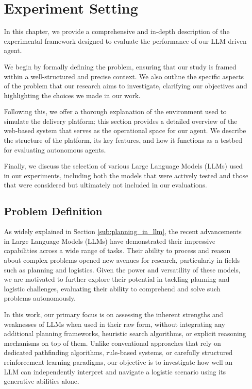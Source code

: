 \chapter{Experiment Setting}
\label{cha:experiment_setting}

In this chapter, we provide a comprehensive and in-depth description of the experimental
framework designed to evaluate the performance of our LLM-driven agent.

We begin by formally defining the problem, ensuring that our study is framed
within a well-structured and precise context. We also outline the specific aspects
of the problem that our research aims to investigate, clarifying our objectives
and highlighting the choices we made in our work.

Following this, we offer a thorough explanation of the environment used to simulate
the delivery platform; this section provides a detailed overview of the web-based
system that serves as the operational space for our agent. We describe the structure
of the platform, its key features, and how it functions as a testbed for evaluating
autonomous agents.

Finally, we discuss the selection of various Large Language Models (LLMs) used
in our experiments, including both the models that were actively tested and those
that were considered but ultimately not included in our evaluations.

\section{Problem Definition}
\label{sec:problem_definition}

As widely explained in Section \ref{sub:planning_in_llm}, the recent advancements
in Large Language Models (LLMs) have demonstrated their impressive capabilities across
a wide range of tasks. Their ability to process and reason about complex
problems opened new avenues for research, particularly in fields such as planning
and logistics. Given the power and versatility of these models, we are motivated
to further explore their potential in tackling planning and logistic challenges,
evaluating their ability to comprehend and solve such problems autonomously.

In this work, our primary focus is on assessing the inherent strengths and weaknesses
of LLMs when used in their raw form, without integrating any additional planning
frameworks, heuristic search algorithms, or explicit reasoning mechanisms on top
of them. Unlike conventional approaches that rely on dedicated pathfinding algorithms,
rule-based systems, or carefully structured reinforcement learning paradigms,
our objective is to investigate how well an LLM can independently interpret and
navigate a logistic scenario using its generative abilities alone.

